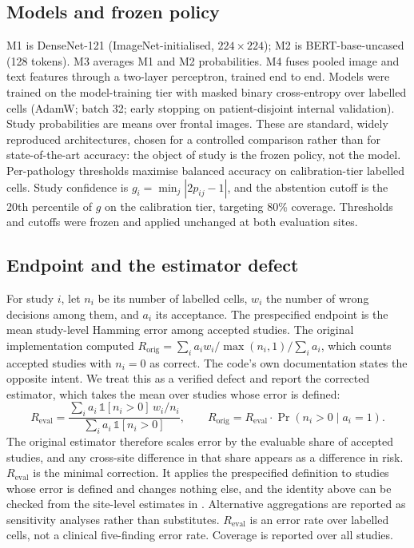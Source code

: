 \subsection*{Models and frozen policy}
M1 is DenseNet-121\cite{huang2017} (ImageNet-initialised, $224\times224$); M2 is
BERT-base-uncased\cite{devlin2019} (128 tokens). M3 averages M1 and M2 probabilities. M4 fuses
pooled image and text features through a two-layer perceptron, trained end to
end. Models were trained on the model-training tier with masked binary
cross-entropy over labelled cells (AdamW\cite{loshchilov2019}; batch 32; early stopping on
patient-disjoint internal validation). Study probabilities are means over
frontal images. These are standard, widely reproduced architectures, chosen for
a controlled comparison rather than for state-of-the-art accuracy: the object
of study is the frozen policy, not the model. Per-pathology thresholds maximise balanced accuracy on
calibration-tier labelled cells. Study confidence is
$g_i=\min_j|2p_{ij}-1|$, and the abstention cutoff is the 20th percentile of
$g$ on the calibration tier, targeting 80\% coverage. Thresholds and cutoffs
were frozen and applied unchanged at both evaluation sites.

\subsection*{Endpoint and the estimator defect}
For study $i$, let $n_i$ be its number of labelled cells, $w_i$ the number of
wrong decisions among them, and $a_i$ its acceptance. The prespecified endpoint is
the mean study-level Hamming error among accepted studies. The original
implementation computed $R_{\text{orig}}=\sum_i a_i w_i/\max(n_i,1)/\sum_i a_i$,
which counts accepted studies with $n_i=0$ as correct. The code's own
documentation states the opposite intent. We treat this as a verified defect
and report the corrected estimator, which takes the mean over studies whose
error is defined:
\begin{equation}
R_{\text{eval}}=\frac{\sum_i a_i\,\mathbb{1}[n_i>0]\,w_i/n_i}{\sum_i a_i\,\mathbb{1}[n_i>0]},
\qquad R_{\text{orig}}=R_{\text{eval}}\cdot\Pr(n_i>0\mid a_i=1).
\end{equation}
The original estimator therefore scales error by the evaluable share of
accepted studies, and any cross-site difference in that share appears as a
difference in risk. $R_{\text{eval}}$ is the minimal correction. It applies the
prespecified definition to studies whose error is defined and changes nothing
else, and the identity above can be checked from the site-level estimates in
.
Alternative aggregations are reported as sensitivity analyses rather than
substitutes. $R_{\text{eval}}$ is an error rate over labelled cells, not
a clinical five-finding error rate. Coverage is reported over all studies.


